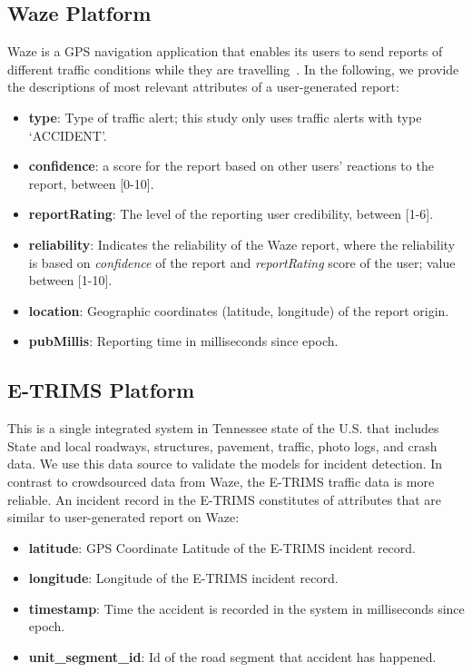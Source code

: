 \documentclass[conference]{IEEEtran}
\begin{document}
\subsection{Waze Platform} \label{subsec:waze_dataset}
Waze is a GPS navigation application that enables its users to send reports of different traffic conditions while they are travelling~\cite{waze_driving_2020}. In the following, we provide the descriptions of most relevant attributes of a user-generated report: \begin{itemize}[leftmargin=*]
    \item \textbf{type}: Type of traffic alert; this study only uses traffic alerts with type `ACCIDENT'.
    \item \textbf{confidence}: a score for the report based on other users' reactions to the report, between [0-10]. \item \textbf{reportRating}: The level of the reporting user credibility, between [1-6].
    \item \textbf{reliability}: Indicates the reliability of the Waze report, where the reliability is based on \textit{confidence} of the report and \textit{reportRating} score of the user; value between [1-10]. 
    \item \textbf{location}: Geographic coordinates (latitude, longitude) of the report origin. 
    \item \textbf{pubMillis}: Reporting time in milliseconds since epoch. 
\end{itemize}


\subsection{E-TRIMS Platform}

This is a single integrated system in Tennessee state of the U.S. that includes State and local roadways, structures, pavement, traffic, photo logs, and crash data. We use this data source to validate the models for incident detection. In contrast to crowdsourced data from Waze, the E-TRIMS traffic data is more reliable. An incident record in the E-TRIMS constitutes of attributes that are similar to user-generated report on Waze: 

\begin{itemize}[leftmargin=*]
    \item \textbf{latitude}: GPS Coordinate Latitude of the E-TRIMS incident record.
    \item \textbf{longitude}: Longitude of the E-TRIMS incident record.
    \item \textbf{timestamp}: Time the accident is recorded in the system in milliseconds since epoch. 
    \item \textbf{unit\_segment\_id}: Id of the road segment that accident has happened. 
\end{itemize}
\end{document}
